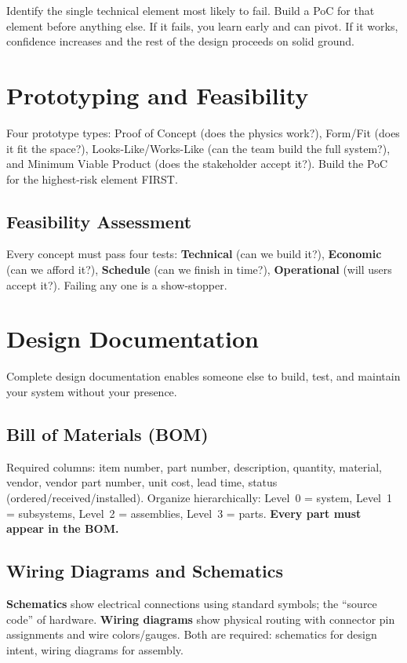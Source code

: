 \documentclass[11pt,letterpaper,twoside,openany]{book}
\begin{document}
\begin{tipbox}
Identify the single technical element most likely to fail. Build a PoC for that element before anything else. If it fails, you learn early and can pivot. If it works, confidence increases and the rest of the design proceeds on solid ground.
\end{tipbox}

\section{Prototyping and Feasibility}
Four prototype types: Proof of Concept (does the physics work?), Form/Fit (does it fit the space?), Looks-Like/Works-Like (can the team build the full system?), and Minimum Viable Product (does the stakeholder accept it?). Build the PoC for the highest-risk element FIRST.

\subsection{Feasibility Assessment}
Every concept must pass four tests: \textbf{Technical} (can we build it?), \textbf{Economic} (can we afford it?), \textbf{Schedule} (can we finish in time?), \textbf{Operational} (will users accept it?). Failing any one is a show-stopper.


\section{Design Documentation}
Complete design documentation enables someone else to build, test, and maintain your system without your presence.

\subsection{Bill of Materials (BOM)}
Required columns: item number, part number, description, quantity, material, vendor, vendor part number, unit cost, lead time, status (ordered/received/installed). Organize hierarchically: Level~0 = system, Level~1 = subsystems, Level~2 = assemblies, Level~3 = parts. \textbf{Every part must appear in the BOM.}

\subsection{Wiring Diagrams and Schematics}
\textbf{Schematics} show electrical connections using standard symbols; the ``source code'' of hardware. \textbf{Wiring diagrams} show physical routing with connector pin assignments and wire colors/gauges. Both are required: schematics for design intent, wiring diagrams for assembly.
\end{document}

